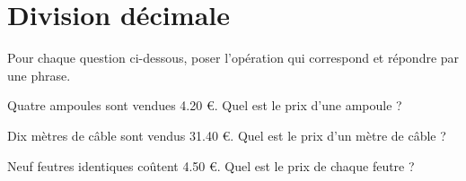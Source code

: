 \section{Division décimale}

Pour chaque question ci-dessous, poser l'opération qui correspond et répondre par une phrase.

\begin{questions}
	\question Quatre ampoules sont vendues \num{4.20} €. Quel est le prix d'une ampoule ?
	
	\question Dix mètres de câble sont vendus \num{31.40} €. Quel est le prix d'un mètre de câble ?
	
	\question Neuf feutres identiques coûtent \num{4.50} €. Quel est le prix de chaque feutre ?
	
	
\end{questions}